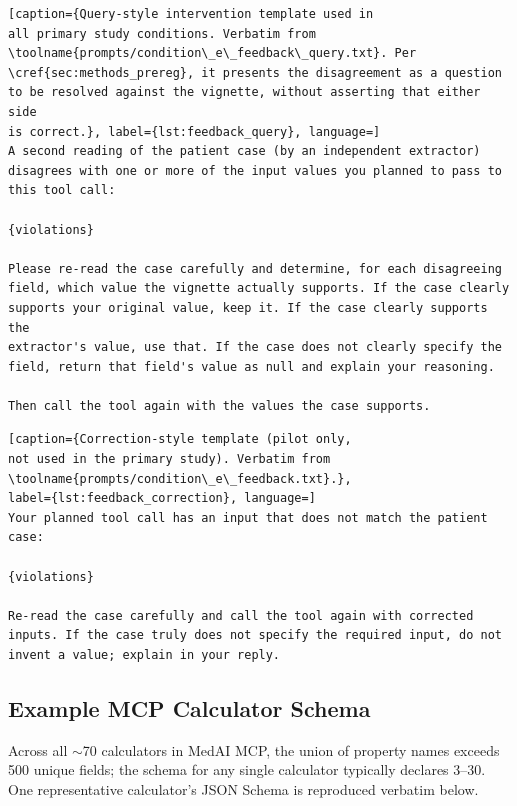 \begin{lstlisting}[caption={Query-style intervention template used in
all primary study conditions. Verbatim from
\toolname{prompts/condition\_e\_feedback\_query.txt}. Per
\cref{sec:methods_prereg}, it presents the disagreement as a question
to be resolved against the vignette, without asserting that either side
is correct.}, label={lst:feedback_query}, language=]
A second reading of the patient case (by an independent extractor)
disagrees with one or more of the input values you planned to pass to
this tool call:

{violations}

Please re-read the case carefully and determine, for each disagreeing
field, which value the vignette actually supports. If the case clearly
supports your original value, keep it. If the case clearly supports the
extractor's value, use that. If the case does not clearly specify the
field, return that field's value as null and explain your reasoning.

Then call the tool again with the values the case supports.
\end{lstlisting}

\begin{lstlisting}[caption={Correction-style template (pilot only,
not used in the primary study). Verbatim from
\toolname{prompts/condition\_e\_feedback.txt}.},
label={lst:feedback_correction}, language=]
Your planned tool call has an input that does not match the patient case:

{violations}

Re-read the case carefully and call the tool again with corrected
inputs. If the case truly does not specify the required input, do not
invent a value; explain in your reply.
\end{lstlisting}

\subsection{Example MCP Calculator Schema}
\label{app:bmi_schema}

Across all $\sim$70 calculators in MedAI MCP, the union of property
names exceeds 500 unique fields; the schema for any single calculator
typically declares 3--30. One representative calculator's JSON Schema
is reproduced verbatim below.

